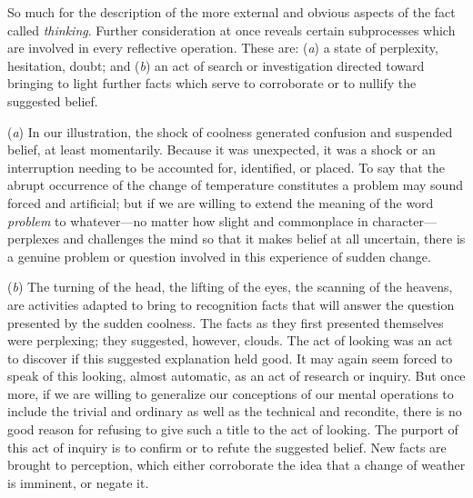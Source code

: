 \documentclass[letterpaper]{book}
\begin{document}
So much for the description of the more external and obvious aspects of
the fact called \emph{thinking}. Further consideration at once reveals
certain subprocesses which are involved in every reflective operation.
These are: (\emph{a}) a state of perplexity, hesitation, doubt; and
(\emph{b}) an act of search or investigation directed toward bringing to
light further facts which serve to corroborate or to nullify the
suggested belief.


(\emph{a}) In our illustration, the shock of coolness generated
confusion and suspended belief, at least momentarily. Because it was
unexpected, it was a shock or an interruption needing to be accounted
for, identified, or placed. To say that the abrupt occurrence of the
change of temperature constitutes a problem may sound forced and
artificial; but if we are willing to extend the meaning of the word
\emph{problem} to whatever---no matter how slight and commonplace in
character---perplexes and challenges the mind so that it makes belief at
all uncertain, there is a genuine problem or question involved in this
experience of sudden change.


(\emph{b}) The turning of the head, the lifting of the eyes, the
scanning of the heavens, are activities adapted to bring to recognition
facts that will answer the question presented by the sudden coolness.
The facts as
they
first presented themselves were perplexing; they suggested, however,
clouds. The act of looking was an act to discover if this suggested
explanation held good. It may again seem forced to speak of this
looking, almost automatic, as an act of research or inquiry. But once
more, if we are willing to generalize our conceptions of our mental
operations to include the trivial and ordinary as well as the technical
and recondite, there is no good reason for refusing to give such a title
to the act of looking. The purport of this act of inquiry is to confirm
or to refute the suggested belief. New facts are brought to perception,
which either corroborate the idea that a change of weather is imminent,
or negate it.

\end{document}
